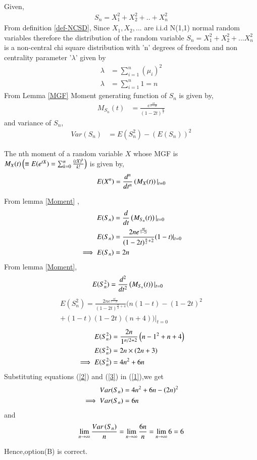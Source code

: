 \documentclass[journal,12pt,twocolumn]{IEEEtran}
\begin{document}
\\Given,
\begin{align}
    S_{n}=X_{1}^{2}+X_{2}^2+..+X_{n}^2
\end{align}
From definition \ref{def-NCSD},
Since $X_{1},X_{2},...$ are i.i.d N(1,1) normal random variables therefore the distribution of the random variable $S_{n}=X_{1}^{2}+X_{2}^{2}+...X_{n}^{2}$ is a non-central chi square distribution with 'n' degrees of freedom and non centrality parameter '$\lambda$' given by
\begin{align}
    \lambda&=\sum_{i=1}^{n}(\mu_{i})^{2}
    \\\lambda&=\sum_{i=1}^{n}1=n
\end{align}
\newpage
From Lemma \ref{MGF} Moment generating function of $S_{n}$ is given by,
\begin{align}
    M_{S_{n}}(t)&=\frac{e^{\frac{n t}{1-2t}}}{(1-2t)^{\frac{n}{2}}}
\end{align}
and variance of $S_{n}$,
\begin{align}
Var(S_{n})&=E(S_{n}^2)-(E(S_{n}))^2
\label{1}
\end{align}
\begin{lemma}
 The nth moment of a random variable $X$ whose MGF is $M_{X}(t)\left(\equiv E(e^{tX})=\sum_{k=0}^{n}\frac{(tX)^k}{k!}\right)$ is given by,
 \begin{align}
     E(X^{n})=\frac{d^{n}}{dt^{n}}\left(M_{X}(t)\right)|_{t=0}
     \label{4}
 \end{align}
 \label{Moment}
\end{lemma}
From lemma \ref{Moment} ,
\begin{align}
 E(S_{n})&=\frac{d}{dt}\left(M_{S_{n}}(t)\right)|_{t=0}
\\E(S_{n})&=\frac{2ne^{\frac{nt}{1-2t}}}{(1-2t)^{\frac{n}{2}+2}}(1-t)|_{t=0}
\\\implies  E(S_{n})&=2n \label{2}
\end{align}
From lemma \ref{Moment},
\begin{align}
  E(S_{n}^2)&=\frac{d^{2}}{dt^{2}}\left(M_{S_{n}}(t)\right)|_{t=0}
\end{align}
\begin{multline}
 E(S_{n}^2)=\frac{2ne^{\frac{nt}{1-2t}}}{(1-2t)^{\frac{n}{2}+4}}(n(1-t)-(1-2t)^{2}\\
 +(1-t)(1-2t)(n+4))|_{t=0}
\end{multline}
\begin{align}
E(S_{n}^2)&=\frac{2n}{1^{n/2+2}}\left(n-1^2+n+4\right)
\\E(S_{n}^2)&=2n\times(2n+3)
\\\implies E(S_{n}^2)&=4n^{2}+6n
\label{3}
\end{align}
Substituting equations (\ref{2}) and (\ref{3}) in (\ref{1}),we get 
\begin{align}
    Var(S_{n})&=4n^{2}+6n-\left(2n\right)^{2}
\\ \implies Var(S_{n})&=6n
\end{align}
and
$$\lim_{n \to \infty}{\frac{Var\left(S_{n}\right)}{n}}=\lim_{n \to \infty}{\frac{6n}{n}}=\lim_{n \to \infty}{6}=6$$

Hence,option(B) is correct.
    
 
\end{document}
